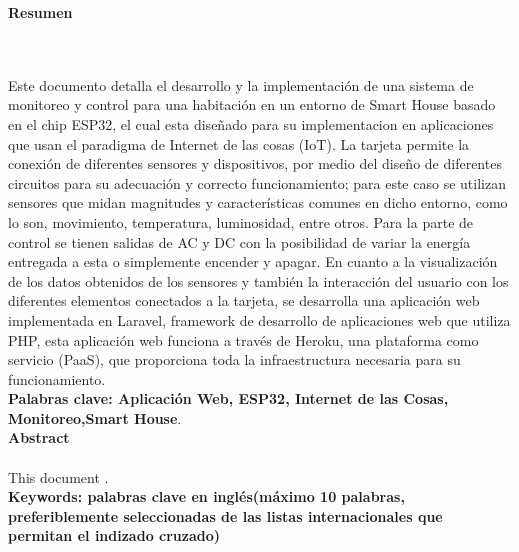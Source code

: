 \newpage
\textbf{\LARGE Resumen}
\\\\
Este documento detalla el desarrollo y la implementación de una sistema de monitoreo y control para una habitación en un entorno de Smart House basado en el chip ESP32, el cual esta diseñado para su implementacion en aplicaciones que usan el paradigma de Internet de las cosas (IoT). La tarjeta permite la conexión de diferentes sensores y dispositivos, por medio del diseño de diferentes circuitos para su adecuación y correcto funcionamiento; para este caso se utilizan sensores que midan magnitudes y características comunes en dicho entorno, como lo son, movimiento, temperatura, luminosidad, entre otros. Para la parte de control se tienen salidas de AC y DC con la posibilidad de variar la energía entregada a esta o simplemente encender y apagar. En cuanto a la visualización de los datos obtenidos de los sensores y también la interacción del usuario con los diferentes elementos conectados a la tarjeta, se desarrolla una aplicación web implementada en Laravel, framework de desarrollo de aplicaciones web que utiliza PHP, esta aplicación web funciona a través de Heroku, una plataforma como servicio (PaaS), que proporciona toda la infraestructura necesaria para su funcionamiento.\\
\textbf{\small Palabras clave: Aplicación Web, ESP32, Internet de las Cosas, Monitoreo,Smart House}.\\[2.0cm]
\textbf{\LARGE Abstract}\\\\
This document .\\[2.0cm]
\textbf{\small Keywords: palabras clave en ingl\'{e}s(m\'{a}ximo 10 palabras, preferiblemente seleccionadas de las listas internacionales que permitan el indizado cruzado)}\\